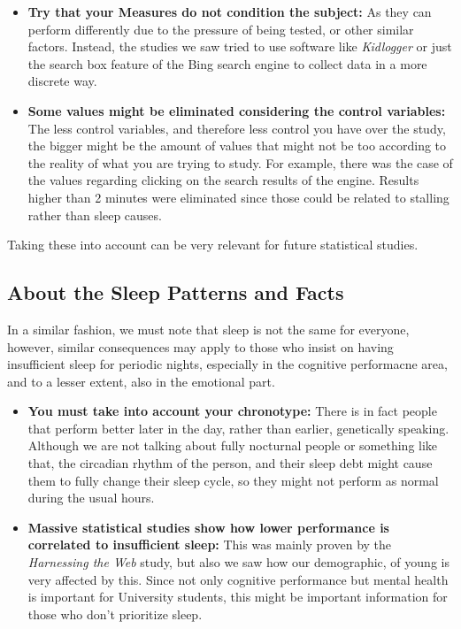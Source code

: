 \documentclass[]{IEEEtran}
\begin{document}
\begin{itemize}
    \item \textbf{Try that your Measures do not condition the subject:} As they can perform differently due to the pressure of being tested, or other similar factors. Instead, the studies we saw tried to use software like \textit{Kidlogger} or just the search box feature of the Bing search engine to collect data in a more discrete way.
    \item \textbf{Some values might be eliminated considering the control variables:} The less control variables, and therefore less control you have over the study, the bigger might be the amount of values that might not be too according to the reality of what you are trying to study. For example, there was the case of the values regarding clicking on the search results of the engine. Results higher than 2 minutes were eliminated since those could be related to stalling rather than sleep causes.
\end{itemize}

Taking these into account can be very relevant for future statistical studies. 

\subsection{About the Sleep Patterns and Facts}

In a similar fashion, we must note that sleep is not the same for everyone, however, similar consequences may apply to those who insist on having insufficient sleep for periodic nights, especially in the cognitive performacne area, and to a lesser extent, also in the emotional part. 

\begin{itemize}
    \item \textbf{You must take into account your chronotype:} There is in fact people that perform better later in the day, rather than earlier, genetically speaking. Although we are not talking about fully nocturnal people or something like that, the circadian rhythm of the person, and their sleep debt might cause them to fully change their sleep cycle, so they might not perform as normal during the usual hours.
    \item \textbf{Massive statistical studies show how lower performance is correlated to insufficient sleep:} This was mainly proven by the \textit{Harnessing the Web} study, but also we saw how our demographic, of young is very affected by this. Since not only cognitive performance but mental health is important for University students, this might be important information for those who don't prioritize sleep. 
\end{itemize}
\end{document}

